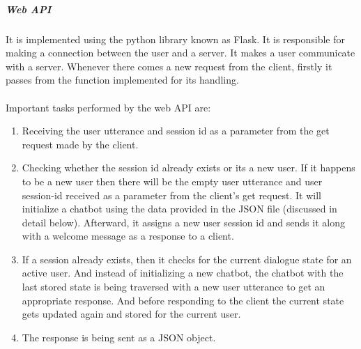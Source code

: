 \subparagraph*{Web API}
It is implemented using the python library known as Flask. It is responsible for making a connection between the user and a server. It makes a user communicate with a server. Whenever there comes a new request from the client, firstly it passes from the function implemented for its handling.
\\~\\
Important tasks performed by the web API are:
\begin{enumerate}
    \item Receiving the user utterance and session id as a parameter from the get request made by the client.
    \item Checking whether the session id already exists or its a new user. If it happens to be a new user then there will be the empty user utterance and user session-id received as a parameter from the client's get request. It will initialize a chatbot using the data provided in the JSON file (discussed in detail below). Afterward, it assigns a new user session id and sends it along with a welcome message as a response to a client.
    \item If a session already exists, then it checks for the current dialogue state for an active user. And instead of initializing a new chatbot, the chatbot with the last stored state is being traversed with a new user utterance to get an appropriate response. And before responding to the client the current state gets updated again and stored for the current user.
     \item The response is being sent as a JSON object.
\end{enumerate} 

